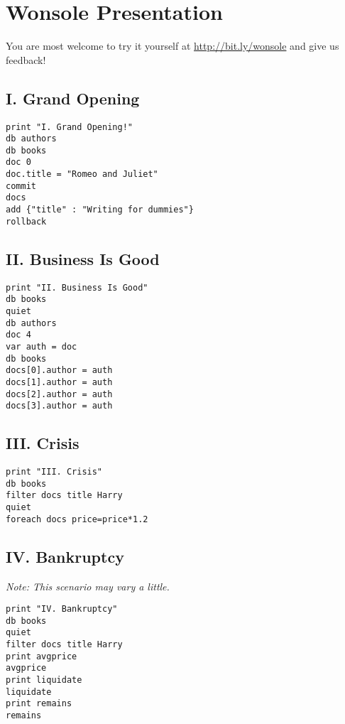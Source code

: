 \thispagestyle{empty}
\section*{Wonsole Presentation}
You are most welcome to try it yourself at \url{http://bit.ly/wonsole} and give
us feedback!
\subsection*{I. Grand Opening}
\begin{verbatim}
print "I. Grand Opening!"
db authors
db books
doc 0
doc.title = "Romeo and Juliet"
commit
docs
add {"title" : "Writing for dummies"}
rollback
\end{verbatim}

\subsection*{II. Business Is Good}
\begin{verbatim}
print "II. Business Is Good"
db books
quiet
db authors
doc 4
var auth = doc
db books
docs[0].author = auth
docs[1].author = auth
docs[2].author = auth
docs[3].author = auth
\end{verbatim}

\subsection*{III. Crisis}
\begin{verbatim}
print "III. Crisis"
db books
filter docs title Harry
quiet
foreach docs price=price*1.2
\end{verbatim}

\subsection*{IV. Bankruptcy}
\textit{Note: This scenario may vary a little.}
\begin{verbatim}
print "IV. Bankruptcy"
db books
quiet
filter docs title Harry
print avgprice
avgprice
print liquidate
liquidate
print remains
remains
\end{verbatim}


\clearpage
\thispagestyle{empty}
